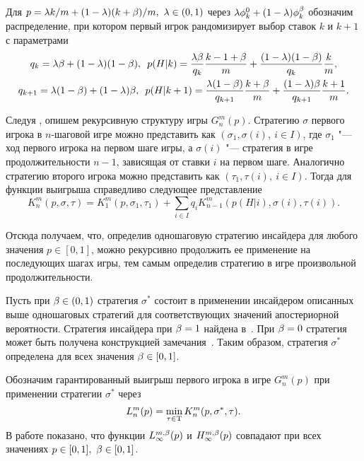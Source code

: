Для $p = \lambda k/m + (1-\lambda) (k+\beta)/m,\ \lambda \in (0, 1)$ через $\lambda \phi^0_k + (1-\lambda)\phi^{\beta}_k$ обозначим распределение, при котором первый игрок рандомизирует выбор ставок $k$ и $k+1$ с параметрами
\begin{gather*}
  q_k = \lambda\beta + (1-\lambda)(1-\beta),\enskip
  p(H|k) = \frac{\lambda\beta}{q_k} \frac{k-1+\beta}{m} + \frac{(1-\lambda)(1-\beta)}{q_k} \frac{k}{m},\\
  q_{k+1} = \lambda(1-\beta) + (1-\lambda)\beta,\enskip
  p(H|k+1) = \frac{\lambda(1-\beta)}{q_{k+1}} \frac{k+\beta}{m} + \frac{(1-\lambda)\beta}{q_{k+1}} \frac{k+1}{m}.
\end{gather*}

Следуя \cite{domansky07}, опишем рекурсивную структуру игры $G^m_n(p)$.
Стратегию $\sigma$ первого игрока в $n$-шаговой игре можно представить как $(\sigma_1, \sigma(i),\ i \in I)$, где $\sigma_1$ "--- ход первого игрока на первом шаге игры, а $\sigma(i)$ "--- стратегия в игре продолжительности $n-1$, зависящая от ставки $i$ на первом шаге.
Аналогично стратегию второго игрока можно представить как $(\tau_1, \tau(i),\ i \in I)$.
Тогда для функции выигрыша справедливо следующее представление
\begin{equation}
  \label{ch1:eq:recursive-structure}
  K^m_n(p,\sigma,\tau) = 
  K^m_1(p,\sigma_1,\tau_1) + \sum_{i \in I} q_i K^m_{n-1}(p(H|i),\sigma(i),\tau(i)).
\end{equation}

Отсюда получаем, что, определив одношаговую стратегию инсайдера для любого значения $p \in [0,1]$, можно рекурсивно продолжить ее применение на последующих шагах игры, тем самым определив стратегию в игре произвольной продолжительности.

Пусть при $\beta \in (0,1)$ стратегия $\sigma^*$ состоит в применении инсайдером описанных выше одношаговых стратегий для соответствующих значений апостериорной вероятности. 
Стратегия инсайдера при $\beta = 1$ найдена в~\cite{domansky07}.
При $\beta = 0$ стратегия может быть получена конструкцией замечания~\label{ch1:rem:symm-payoffs}.
Таким образом, стратегия $\sigma^*$ определена для всех значения $\beta \in [0,1]$.

Обозначим гарантированный выигрыш первого игрока в игре $G^m_n(p)$ при применении стратегии $\sigma^*$ через
\begin{equation*}
  L^m_n(p) = \min_{\tau \in \mathrm{T}} K^m_n(p,\sigma^*,\tau).
\end{equation*}
В работе показано, что функции $L^{m,\beta}_\infty(p)$ и $H^{m,\beta}_\infty(p)$ совпадают при всех значениях $p \in [0,1],\ \beta \in [0,1]$.

